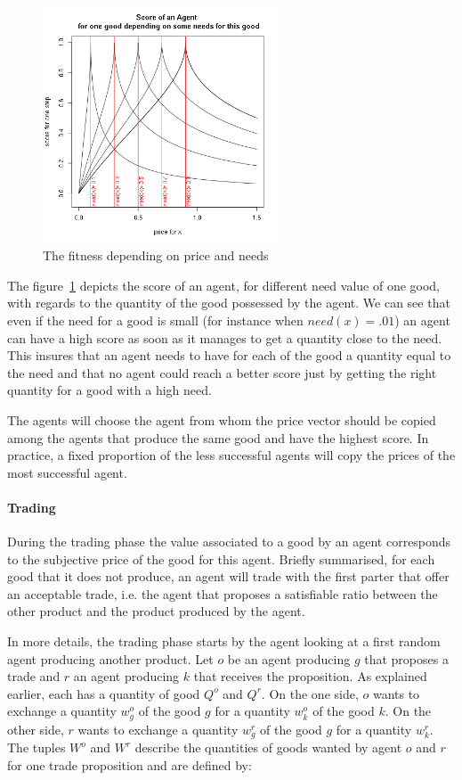 \documentclass{wscpaperproc}
\begin{document}
\begin{figure}[htp]
	\begin{center}
		\includegraphics[width=7cm]{img/fitness.png}
	\end{center}
	\caption{The fitness depending on price and needs}
	\label{fig:fit}
\end{figure}
The figure~\ref{fig:fit} depicts the score of an agent, for different need value of one good, with regards to the quantity of the good possessed by the agent. We can see that even if the need for a good is small (for instance when $need(x) = .01$) an agent can have a high score as soon as it manages to get a quantity close to the need. This insures that an agent needs to have for each of the good a quantity equal to the need and that no agent could reach a better score just by getting the right quantity for a good with a high need.

The agents will choose the agent from whom the price vector should be copied among the agents that produce the same good and have the highest score. In practice, a fixed proportion of the less successful agents will copy the prices of the most successful agent. 


\paragraph{Trading} 
During the trading phase the value associated to a good by an agent corresponds to the subjective price of the good for this agent. Briefly summarised, for each good that it does not produce, an agent will trade with the first parter that offer an acceptable trade, i.e. the agent that proposes a satisfiable ratio between the other product and the product produced by the agent. 

In more details, the trading phase starts by the agent looking at a first random agent producing another product. 
Let $o$ be an agent producing $g$ that proposes a trade and $r$ an agent producing $k$ that receives the proposition. As explained earlier, each has a quantity of good $Q^o$ and $Q^r$. On the one side, $o$ wants to exchange a quantity $w_g^o$ of the good $g$ for a quantity $w_k^o$ of the good $k$. On the other side, $r$ wants to exchange a quantity $w_g^r$ of the good $g$ for a quantity $w_k^r$. The tuples $W^o$ and $W^r$ describe the quantities of goods wanted by agent $o$ and $r$ for one trade proposition and are defined by:  
\end{document}
